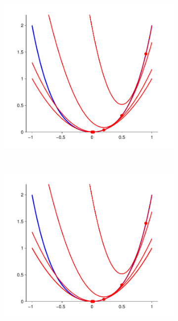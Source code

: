 \begin{figure}
\begin{subfigure}[b]{0.2\textwidth}
		\includegraphics[width=\textwidth]{./lecture7/Newton4}
	\end{subfigure}
	~
	\begin{subfigure}[b]{0.2\textwidth}
		\includegraphics[width=\textwidth]{./lecture7/Newton5}
	\end{subfigure}
	~
	\begin{subfigure}[b]{0.2\textwidth}

\end{subfigure}
\end{figure}
